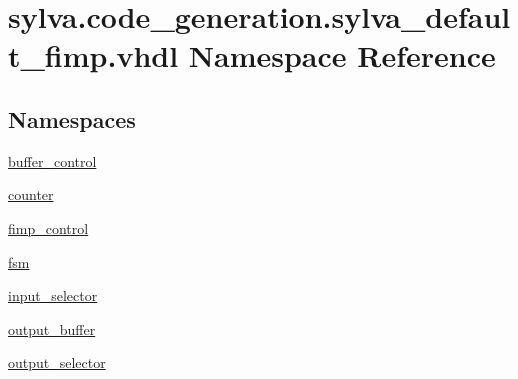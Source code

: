 \hypertarget{namespacesylva_1_1code__generation_1_1sylva__default__fimp_1_1vhdl}{}\section{sylva.\+code\+\_\+generation.\+sylva\+\_\+default\+\_\+fimp.\+vhdl Namespace Reference}
\label{namespacesylva_1_1code__generation_1_1sylva__default__fimp_1_1vhdl}
\subsection*{Namespaces}
\begin{DoxyCompactItemize}
\item 
 \hyperlink{namespacesylva_1_1code__generation_1_1sylva__default__fimp_1_1vhdl_1_1buffer__control}{buffer\+\_\+control}
\item 
 \hyperlink{namespacesylva_1_1code__generation_1_1sylva__default__fimp_1_1vhdl_1_1counter}{counter}
\item 
 \hyperlink{namespacesylva_1_1code__generation_1_1sylva__default__fimp_1_1vhdl_1_1fimp__control}{fimp\+\_\+control}
\item 
 \hyperlink{namespacesylva_1_1code__generation_1_1sylva__default__fimp_1_1vhdl_1_1fsm}{fsm}
\item 
 \hyperlink{namespacesylva_1_1code__generation_1_1sylva__default__fimp_1_1vhdl_1_1input__selector}{input\+\_\+selector}
\item 
 \hyperlink{namespacesylva_1_1code__generation_1_1sylva__default__fimp_1_1vhdl_1_1output__buffer}{output\+\_\+buffer}
\item 
 \hyperlink{namespacesylva_1_1code__generation_1_1sylva__default__fimp_1_1vhdl_1_1output__selector}{output\+\_\+selector}
\end{DoxyCompactItemize}
